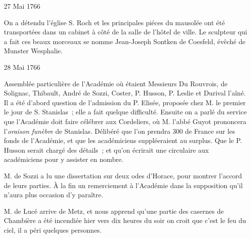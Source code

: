                      \begin{diary}{27 Mai 1766}{}
                        
                         On a détendu l’église S. Roch et les
                              principales piéces du mausolée ont été
                           transportées dans un cabinet à côté
                           de la salle de l'hôtel de ville. Le sculpteur
                           qui a fait ces beaux morceaux se nomme Jean-Joseph
                              Sontken de Coesfeld, évêché de Munster Wesphalie. \bigskip
        
        
                     \end{diary}
                     \begin{diary}{28 Mai 1766}{}
                        
                         Assemblée particulière de l'Académie où étaient
                           Messieurs
                           Du Rouvrois, de Solignac, Thibault, André
                           de Sozzi, Coster, P. Husson,
                              P. Leslie et Durival
                              l'aîné. Il a été d'abord question de l'admission
                           du P. Elisée, proposée chez
                           M. le premier le jour
                           de S. Stanislas ; elle a fait quelque difficulté.
                           Ensuite on a parlé du service que l'Académie
                           doit faire célébrer aux Cordeliers, où M.
                              l'abbé Guyot prononcera l'\emph{oraison funèbre} de Stanislas.
                           Délibéré que l'on prendra 300 de France sur
                           les fonds de l'Académie, et
                           que les académiciens suppléeraient au surplus. Que le P. Husson
                           serait chargé des détails ; et qu'on écrirait
                           une circulaire aux académiciens pour y assister
                           en nombre. \bigskip
        
        
                        
                           M. de Sozzi a lu une dissertation sur deux
                              odes d'Horace, pour montrer l'accord de leurs
                           parties. À la fin un remerciement à l'Académie
                           dans la supposition qu'il n'aura plus
                           occasion d'y paraître. \bigskip
        
        
                        
                           M. de Lucé arrive de Metz, et nous apprend
                           qu'une partie des casernes de
                              Chambière
                           a été incendiée hier vers dix heures du soir
                           on croit que c'est le feu du ciel, il a
                           péri quelques personnes. \bigskip
        
        
                     \end{diary}

